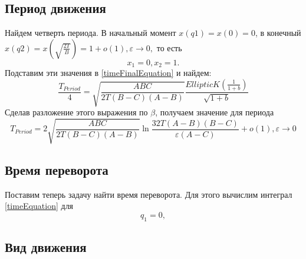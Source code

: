 \documentclass{article}
\begin{document}
\subsection{Период движения}
Найдем четверть периода. В начальный момент \begin{math} x(q1)=x(0)=0 \end{math}, в конечный \begin{math} x(q2)=x(\sqrt{\frac{2T}{B}})=1+o(1),\varepsilon\rightarrow 0, \end{math} то есть
\begin{equation}
x_1=0, x_2=1.
\end{equation}
Подставим эти значения в \ref{timeFinalEquation} и найдем:
\begin{equation}
\frac{T_{Period}}{4}=\sqrt{\frac{ABC}{2T(B-C)(A-B)}}\frac{EllipticK(\frac{1}{1 + b})}{\sqrt{1 + b}}
\end{equation}
Сделав разложение этого выражения по \begin{math} \beta \end{math}, получаем значение для периода
\begin{equation}
T_{Period}=2\sqrt{\frac{ABC}{2T(B-C)(A-B)}}\ln{\frac{32T(A-B)(B-C)}{\varepsilon(A-C)}}+o(1),\varepsilon\rightarrow 0
\end{equation}

\subsection{Время переворота}
Поставим теперь задачу найти время переворота. Для этого вычислим интеграл \ref{timeEquation} для
\begin{equation}
q_1=0,
\end{equation}

\subsection{Вид движения}
\end{document}
